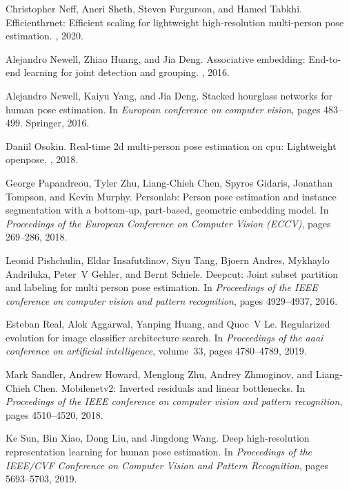 \documentclass[10pt,twocolumn,letterpaper]{article}
\begin{document}
{\begin{thebibliography}{10}
Christopher Neff, Aneri Sheth, Steven Furgurson, and Hamed Tabkhi.
\newblock Efficienthrnet: Efficient scaling for lightweight high-resolution
  multi-person pose estimation.
, 2020.

Alejandro Newell, Zhiao Huang, and Jia Deng.
\newblock Associative embedding: End-to-end learning for joint detection and
  grouping.
, 2016.

Alejandro Newell, Kaiyu Yang, and Jia Deng.
\newblock Stacked hourglass networks for human pose estimation.
\newblock In {\em European conference on computer vision}, pages 483--499.
  Springer, 2016.

Daniil Osokin.
\newblock Real-time 2d multi-person pose estimation on cpu: Lightweight
  openpose.
, 2018.

George Papandreou, Tyler Zhu, Liang-Chieh Chen, Spyros Gidaris, Jonathan
  Tompson, and Kevin Murphy.
\newblock Personlab: Person pose estimation and instance segmentation with a
  bottom-up, part-based, geometric embedding model.
\newblock In {\em Proceedings of the European Conference on Computer Vision
  (ECCV)}, pages 269--286, 2018.

Leonid Pishchulin, Eldar Insafutdinov, Siyu Tang, Bjoern Andres, Mykhaylo
  Andriluka, Peter~V Gehler, and Bernt Schiele.
\newblock Deepcut: Joint subset partition and labeling for multi person pose
  estimation.
\newblock In {\em Proceedings of the IEEE conference on computer vision and
  pattern recognition}, pages 4929--4937, 2016.

Esteban Real, Alok Aggarwal, Yanping Huang, and Quoc~V Le.
\newblock Regularized evolution for image classifier architecture search.
\newblock In {\em Proceedings of the aaai conference on artificial
  intelligence}, volume~33, pages 4780--4789, 2019.

Mark Sandler, Andrew Howard, Menglong Zhu, Andrey Zhmoginov, and Liang-Chieh
  Chen.
\newblock Mobilenetv2: Inverted residuals and linear bottlenecks.
\newblock In {\em Proceedings of the IEEE conference on computer vision and
  pattern recognition}, pages 4510--4520, 2018.

Ke Sun, Bin Xiao, Dong Liu, and Jingdong Wang.
\newblock Deep high-resolution representation learning for human pose
  estimation.
\newblock In {\em Proceedings of the IEEE/CVF Conference on Computer Vision and
  Pattern Recognition}, pages 5693--5703, 2019.


\end{thebibliography}}
\end{document}
